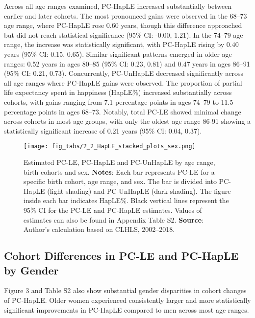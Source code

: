 \documentclass[12pt, a4paper]{article}
\begin{document}
Across all age ranges examined, PC-HapLE increased substantially between earlier and later cohorts. The most pronounced gains were observed in the 68–73 age range, where PC-HapLE rose 0.60 years, though this difference approached but did not reach statistical significance (95\% CI: -0.00, 1.21). In the 74–79 age range, the increase was statistically significant, with PC-HapLE rising by 0.40 years (95\% CI: 0.15, 0.65). Similar significant patterns emerged in older age ranges: 0.52 years in ages 80–85 (95\% CI: 0.23, 0.81) and 0.47 years in ages 86–91 (95\% CI: 0.21, 0.73). Concurrently, PC-UnHapLE decreased significantly across all age ranges where PC-HapLE gains were observed. The proportion of partial life expectancy spent in happiness (HapLE\%) increased substantially across cohorts, with gains ranging from 7.1 percentage points in ages 74–79 to 11.5 percentage points in ages 68–73. Notably, total PC-LE showed minimal change across cohorts in most age groups, with only the oldest age range 86-91 showing a statistically significant increase of 0.21 years (95\% CI: 0.04, 0.37).

\begin{figure}[!p]
  \centering
  \texttt{[image: fig\_tabs/2\_2\_HapLE\_stacked\_plots\_sex.png]}
  \caption{Estimated PC-LE, PC-HapLE and PC-UnHapLE by age range, birth cohorts and sex. \textbf{Notes}: Each bar represents PC-LE for a specific birth cohort, age range, and sex. The bar is divided into PC-HapLE (light shading) and PC-UnHapLE (dark shading). The figure inside each bar indicates HapLE\%. Black vertical lines represent the 95\% CI for the PC-LE and PC-HapLE estimates. Values of estimates can also be found in Appendix Table S2. \textbf{Source}: Author's calculation based on CLHLS, 2002–2018.}
\end{figure}

\subsection{Cohort Differences in PC-LE and PC-HapLE by Gender}

Figure 3 and Table S2 also show substantial gender disparities in cohort changes of PC-HapLE. Older women experienced consistently larger and more statistically significant improvements in PC-HapLE compared to men across most age ranges.
\end{document}
